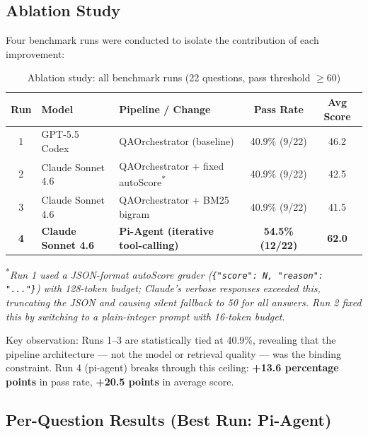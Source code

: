 \documentclass[12pt, a4paper]{article}
\begin{document}
\subsection{Ablation Study}

Four benchmark runs were conducted to isolate the contribution of each improvement:

\begin{table}[ht]
\centering
\caption{Ablation study: all benchmark runs (22 questions, pass threshold $\ge60$)}
\begin{tabularx}{\textwidth}{clXcc}
\toprule
\textbf{Run} & \textbf{Model} & \textbf{Pipeline / Change} & \textbf{Pass Rate} & \textbf{Avg Score} \\
\midrule
1 & GPT-5.5 Codex    & QAOrchestrator (baseline)              & 40.9\% (9/22)  & 46.2 \\
2 & Claude Sonnet 4.6 & QAOrchestrator + fixed autoScore\textsuperscript{*} & 40.9\% (9/22)  & 42.5 \\
3 & Claude Sonnet 4.6 & QAOrchestrator + BM25 bigram            & 40.9\% (9/22)  & 41.5 \\
\textbf{4} & \textbf{Claude Sonnet 4.6} & \textbf{Pi-Agent (iterative tool-calling)} & \textbf{54.5\% (12/22)} & \textbf{62.0} \\
\bottomrule
\end{tabularx}
\end{table}

\noindent\textsuperscript{*}\textit{Run 1 used a JSON-format autoScore grader
(\texttt{\{"score": N, "reason": "..."\}}) with 128-token budget; Claude's verbose
responses exceeded this, truncating the JSON and causing silent fallback to 50 for all
answers. Run 2 fixed this by switching to a plain-integer prompt with 16-token budget.}

Key observation: Runs 1--3 are statistically tied at 40.9\%, revealing that the
pipeline architecture --- not the model or retrieval quality --- was the binding constraint.
Run 4 (pi-agent) breaks through this ceiling: \textbf{+13.6 percentage points} in pass
rate, \textbf{+20.5 points} in average score.

\subsection{Per-Question Results (Best Run: Pi-Agent)}
\end{document}

